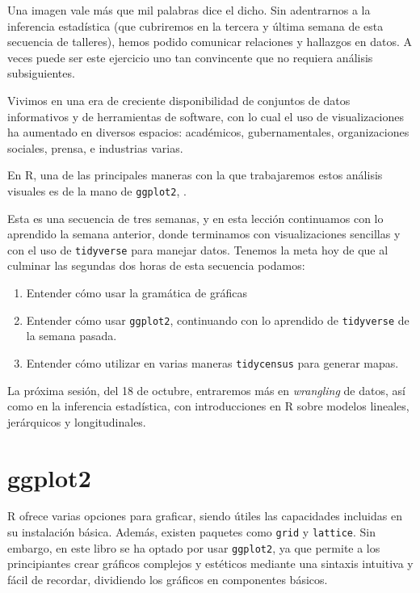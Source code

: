 \documentclass[
]{article}
\begin{document}
Una imagen vale más que mil palabras dice el dicho. Sin adentrarnos a la
inferencia estadística (que cubriremos en la tercera y última semana de
esta secuencia de talleres), hemos podido comunicar relaciones y
hallazgos en datos. A veces puede ser este ejercicio uno tan convincente
que no requiera análisis subsiguientes.

Vivimos en una era de creciente disponibilidad de conjuntos de datos
informativos y de herramientas de software, con lo cual el uso de
visualizaciones ha aumentado en diversos espacios: académicos,
gubernamentales, organizaciones sociales, prensa, e industrias varias.

En R, una de las principales maneras con la que trabajaremos estos
análisis visuales es de la mano de \texttt{ggplot2}, .

Esta es una secuencia de tres semanas, y en esta lección continuamos con
lo aprendido la semana anterior, donde terminamos con visualizaciones
sencillas y con el uso de \texttt{tidyverse} para manejar datos. Tenemos
la meta hoy de que al culminar las segundas dos horas de esta secuencia
podamos:

\begin{enumerate}
\def\labelenumi{\arabic{enumi}.}
\item
  Entender cómo usar la gramática de gráficas
\item
  Entender cómo usar \texttt{ggplot2}, continuando con lo aprendido de
  \texttt{tidyverse} de la semana pasada.
\item
  Entender cómo utilizar en varias maneras \texttt{tidycensus} para
  generar mapas.
\end{enumerate}

La próxima sesión, del 18 de octubre, entraremos más en \emph{wrangling}
de datos, así como en la inferencia estadística, con introducciones en R
sobre modelos lineales, jerárquicos y longitudinales.

\section{ggplot2}\label{ggplot2}

R ofrece varias opciones para graficar, siendo útiles las capacidades
incluidas en su instalación básica. Además, existen paquetes como
\texttt{grid} y \texttt{lattice}. Sin embargo, en este libro se ha
optado por usar \texttt{ggplot2}, ya que permite a los principiantes
crear gráficos complejos y estéticos mediante una sintaxis intuitiva y
fácil de recordar, dividiendo los gráficos en componentes básicos.
\end{document}
